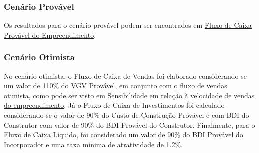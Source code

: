 \documentclass[a4paper]{article}
\begin{document}

\subsubsection{Cenário Provável}\label{cenario-provavel}

Os resultados para o cenário provável podem ser encontrados em
\protect\hyperlink{fluxo-de-caixa-provavel-do-empreendimento}{Fluxo de
Caixa Provável do Empreendimento}.

\subsubsection{Cenário Otimista}\label{cenario-otimista}

No cenário otimista, o Fluxo de Caixa de Vendas foi elaborado
considerando-se um valor de 110\% do VGV Provável, em conjunto com o
fluxo de vendas otimista, como pode ser visto em
\protect\hyperlink{sensibilidade-em-relacao-a-velocidade-de-vendas-do-empreendimento}{Sensibilidade
em relação à velocidade de vendas do empreendimento}. Já o Fluxo de
Caixa de Investimentos foi calculado considerando-se o valor de 90\% do
Custo de Construção Provável e com BDI do Construtor com valor de 90\%
do BDI Provável do Construtor. Finalmente, para o Fluxo de Caixa
Líquido, foi considerado um valor de 90\% do BDI Provável do
Incorporador e uma taxa mínima de atratividade de 1.2\%.

\end{document}
